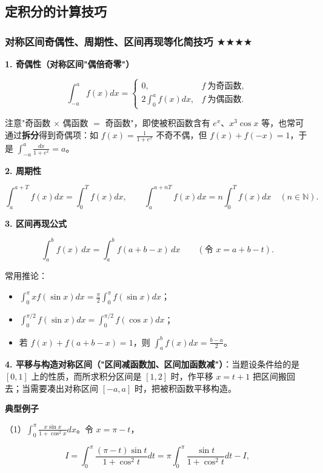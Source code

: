 \documentclass[11pt,openany,UTF8]{ctexbook}
\begin{document}
\subsection{定积分的计算技巧}

\subsubsection{对称区间奇偶性、周期性、区间再现等化简技巧 $\bigstar$$\bigstar$$\bigstar$$\bigstar$}

\textbf{1. 奇偶性（对称区间"偶倍奇零"）}

\[\int_{-a}^{a}f(x)dx=\begin{cases}0, & f\ \text{为奇函数},\\[1mm]2\displaystyle\int_0^{a}f(x)dx, & f\ \text{为偶函数}.\end{cases}\]

注意"奇函数 $\times$ 偶函数 $=$ 奇函数"，即使被积函数含有 $e^x$、$x^3\cos x$ 等，也常可通过\textbf{拆分}得到奇偶项：如 $f(x)=\frac{1}{1+e^x}$ 不奇不偶，但 $f(x)+f(-x)=1$，于是 $\int_{-a}^a\frac{dx}{1+e^x}=a$。

\textbf{2. 周期性}

\[\int_a^{a+T}f(x)dx=\int_0^{T}f(x)dx,\qquad \int_a^{a+nT}f(x)dx=n\int_0^{T}f(x)dx\quad (n\in\mathbb{N}).\]

\textbf{3. 区间再现公式}

\[\int_a^bf(x)\,dx=\int_a^bf(a+b-x)\,dx\qquad(\text{令 }x=a+b-t).\]

常用推论：

\begin{itemize}
\item $\displaystyle\int_0^{\pi}xf(\sin x)dx=\frac{\pi}{2}\int_0^{\pi}f(\sin x)dx$；
\item $\displaystyle\int_0^{\pi/2}f(\sin x)dx=\int_0^{\pi/2}f(\cos x)dx$；
\item 若 $f(x)+f(a+b-x)=1$，则 $\displaystyle\int_a^bf(x)dx=\frac{b-a}{2}$。
\end{itemize}
\textbf{4. 平移与构造对称区间（"区间减函数加、区间加函数减"）}：当题设条件给的是 $[0,1]$ 上的性质，而所求积分区间是 $[1,2]$ 时，作平移 $x=t+1$ 把区间搬回去；当需要凑出对称区间 $[-a,a]$ 时，把被积函数平移构造。

\textbf{典型例子}

（1）$\displaystyle\int_0^{\pi}\frac{x\sin x}{1+\cos^2x}dx$。令 $x=\pi-t$，

\[I=\int_0^{\pi}\frac{(\pi-t)\sin t}{1+\cos^2t}dt=\pi\int_0^{\pi}\frac{\sin t}{1+\cos^2t}dt-I,\]
\end{document}
